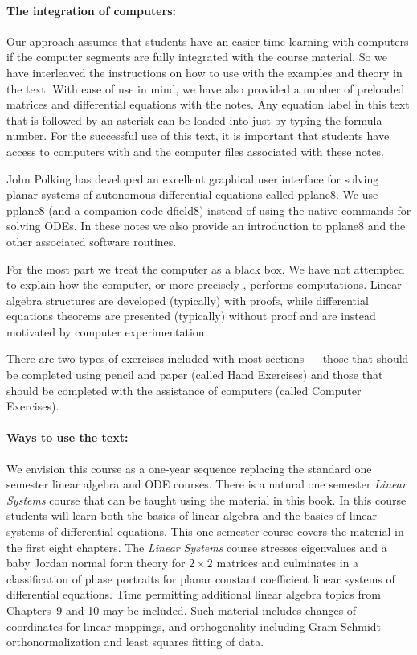 \documentclass{ximera}
\begin{document}
\paragraph{The integration of computers:}  Our approach assumes that students 
have an easier time learning with 
computers if the computer segments are fully integrated with the course 
material.  So we have interleaved the instructions on how to use \Matlab 
with the examples and theory in the text.  With ease of use in mind, we 
have also provided a number of preloaded matrices and differential equations 
with the notes.  Any equation label in this text that is followed by an 
asterisk can be loaded into \Matlab just by typing the formula number.  For 
the successful use of this text, it is important that students have access 
to computers with \Matlab and the computer files associated with these notes.

John Polking has developed an excellent graphical user interface for solving
planar systems of autonomous differential equations called {\sf pplane8}.  
We use {\sf pplane8} (and a companion code 
{\sf dfield8}) instead of using the \Matlab native commands for solving ODEs. 
In these notes we also provide an introduction to {\sf pplane8} and the other 
associated software routines.

For the most part we treat the computer as a black box.  We have not
attempted to explain how the computer, or more precisely \Matlabp, 
performs computations.   Linear algebra structures are developed (typically) 
with proofs, while differential equations theorems are presented (typically) 
without proof and are instead motivated by computer experimentation.  

There are two types of exercises included with most sections --- those that 
should be completed using pencil and paper (called Hand Exercises) and 
those that should be completed with the assistance of computers (called 
Computer Exercises).  

\paragraph{Ways to use the text:}  We envision this course as a one-year 
sequence replacing the standard one semester linear algebra and ODE courses. 
There is a natural one semester {\em Linear Systems\/} course that can be 
taught using the material in this book. In this course students will
learn both the basics of linear algebra and the basics of linear systems of
differential equations.  This one semester course covers the material in the 
first eight chapters.  The {\em Linear Systems\/} course stresses eigenvalues 
and a baby Jordan normal form theory for $2\times 2$ matrices and culminates 
in a classification of phase portraits for planar constant coefficient linear 
systems of differential equations.   Time permitting additional linear 
algebra topics from Chapters~9 and 10 may be included.  Such material 
includes changes of coordinates for linear mappings, and orthogonality 
including Gram-Schmidt orthonormalization and least squares fitting of data.
\end{document}

